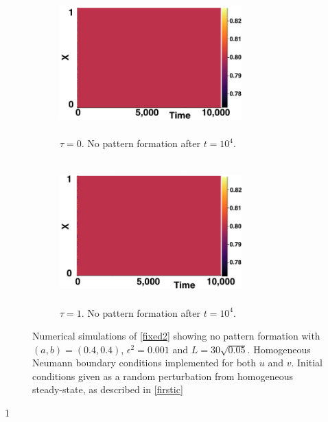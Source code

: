 \begin{figure}[H]
    \centering
    \begin{subfigure}[b]{0.45\textwidth}
        \centering
        \includegraphics[width=7cm,height = 5.5cm]{nopatt1.png}
        \caption{$\tau=0$. No pattern formation after $t=10^4$. }
        \label{}
    \end{subfigure}
    \hfill
    \begin{subfigure}[b]{0.45\textwidth}
        \centering
        \includegraphics[width=7cm,height = 5.5cm]{nopatt2.png}
        \caption{$\tau=1.$ No pattern formation after $t=10^4$.}
        \label{}
    \end{subfigure}
    \caption{Numerical simulations of \eqref{fixed2} showing no pattern formation with $(a,b)=(0.4,0.4)$, $\epsilon^2=0.001$ and $L=30\sqrt{0.05}$. Homogeneous Neumann boundary conditions implemented for both $u$ and $v$. Initial conditions given as a random perturbation from homogeneous steady-state, as described in \eqref{firstic}}
    \label{fig:fixedsim1}
\end{figure}1

